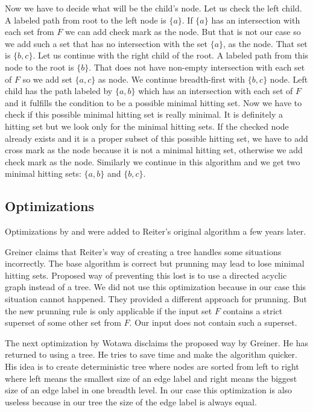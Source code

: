 \documentclass[12pt,a4paper]{article}
\begin{document}
Now we have to decide what will be the child's node. Let us check the left child. A labeled path from root to the left node is $\{a\}$. If $\{a\}$ has an intersection with each set from $F$ we can add check mark as the node. But that is not our case so we add such a set that has no intersection with the set $\{ a \}$, as the node. That set is $\{b,c\}$. Let us continue with the right child of the root. A labeled path from this node to the root is $\{b\}$. That does not have non-empty intersection with each set of $F$ so we add set $\{ a,c \}$ as node. We continue breadth-first with $\{b,c\}$ node. Left child has the path labeled by $\{a,b\}$ which has an intersection with each set of $F$ and it fulfills the condition to be a possible minimal hitting set. Now we have to check if this possible minimal hitting set is really minimal. It is definitely a hitting set but we look only for the minimal hitting sets. If the checked node already exists and it is a proper subset of this possible hitting set, we have to add cross mark as the node because it is not a minimal hitting set, otherwise we add check mark as the node. Similarly we continue in this algorithm and we get two minimal hitting sets: $\{a,b\}$ and $\{b,c\}$.

\subsection{Optimizations}
Optimizations by \cite{greinerReitersCorrection} and \cite{wotawaReitersVariant} were added to Reiter's original algorithm a few years later. 

Greiner claims that Reiter's way of creating a tree handles some situations incorrectly. The base algorithm is correct but prunning may lead to lose minimal hitting sets. Proposed way of preventing this lost is to use a directed acyclic graph instead of a tree. We did not use this optimization because in our case this situation cannot happened. They provided a different approach for prunning. But the new prunning rule is only applicable if the input set $F$ contains a strict superset of some other set from $F$. Our input does not contain such a superset.

The next optimization by Wotawa disclaims the proposed way by Greiner. He has returned to using a tree. He tries to save time and make the algorithm quicker. His idea is to create deterministic tree where nodes are sorted from left to right where left means the smallest size of an edge label and right means the biggest size of an edge label in one breadth level. In our case this optimization is also useless because in our tree the size of the edge label is always equal.
\end{document}
